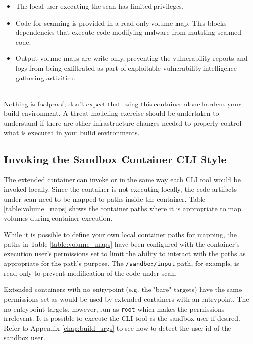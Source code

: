 \begin{itemize}
    \item The local user executing the scan has limited privileges.
    \item Code for scanning is provided in a read-only volume map.
    This blocks dependencies that execute code-modifying malware from mutating scanned code.
    \item Output volume maps are write-only, preventing the vulnerability reports and logs
    from being exfiltrated as part of exploitable vulnerability intelligence gathering activities.
\end{itemize}

\noindent\\Nothing is foolproof; don't expect that using this container alone hardens your build
environment.  A threat modeling exercise should be undertaken to understand
if there are other infrastructure changes needed to properly control what is executed in your
build environments.

\subsection{Invoking the Sandbox Container CLI Style}\label{ssec:invoking_cli}

The extended container can invoke \scaresolver or \cxonecli in the same way each CLI tool would be
invoked locally.  Since the container is not executing locally, the code artifacts under scan
need to be mapped to paths inside the container.  Table \ref{table:volume_maps} shows the
container paths where it is appropriate to map volumes during container execution.  

While it is possible
to define your own local container paths for mapping, the paths in Table \ref{table:volume_maps}
have been configured with the container's execution user's permissions set to limit the ability to
interact with the paths as appropriate for the path's purpose.  The \texttt{/sandbox/input} path,
for example, is read-only to prevent modification of the code under scan.

Extended containers with no entrypoint (e.g. the "bare" targets) have the same permissions set
as would be used by extended containers with an entrypoint.  The no-entrypoint targets, however, run
as \texttt{root} which makes the permissions irrelevant.  It is possible to execute the CLI tool as
the sandbox user if desired.  Refer to Appendix \ref{chap:build_args} to see how to detect the user id
of the sandbox user.



